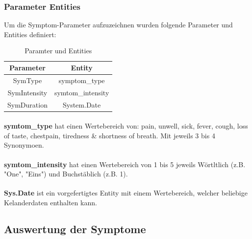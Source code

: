 \documentclass[11pt, letterpaper]{article}
\begin{document}
        \subsubsection{Parameter Entities}
            Um die Symptom-Parameter aufzuzeichnen wurden folgende Parameter und Entities definiert:
            \begin{table}[!h]
                \begin{center}
                    \begin{tabular}{c|c}
                        \textbf{Parameter} & \textbf{Entity}\\
                        \hline
                        SymType & symptom\_type\\
                        SymIntensity & symtom\_intensity\\
                        SymDuration & System.Date
                    \end{tabular}
                    \caption{Paramter und Entities}
                    \label{tab:tabelleParamsUndEntities}
                \end{center}
            \end{table}
            
            \paragraph{}
                \textbf{symtom\_type} hat einen Wertebereich von: pain, unwell,
                sick, fever, cough, loss of taste, chestpain, tiredness \& shortness of breath. Mit jeweils 3 bis 4 
                Synonymoen.
            
            \paragraph{}
                \textbf{symtom\_intensity} hat einen Wertebereich von 1 bis 5 jeweils Wörtltlich (z.B. "One", "Eins") und
                Buchstäblich (z.B. 1).
            
            \paragraph{}
                \textbf{Sys.Date} ist ein vorgefertigtes Entity mit einem Wertebereich, welcher beliebige Kelanderdaten
                enthalten kann.
    \subsection{Auswertung der Symptome}
\end{document}
